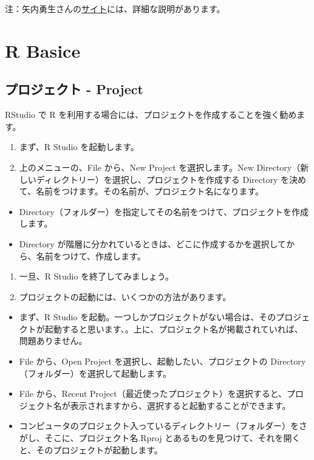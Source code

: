 \documentclass[
]{bxjsbook}
\providecommand{\tightlist}{%
  \setlength{\itemsep}{0pt}\setlength{\parskip}{0pt}}
\theoremstyle{definition}
\theoremstyle{definition}
\theoremstyle{definition}
\theoremstyle{definition}
\theoremstyle{remark}
\begin{document}
注：矢内勇生さんの\href{https://yukiyanai.github.io/jp/resources/docs/install-R_windows.pdf}{サイト}には、詳細な説明があります。

\hypertarget{rbasics}{%
\section{R Basice}\label{rbasics}}

\hypertarget{ux30d7ux30edux30b8ux30a7ux30afux30c8---project}{%
\subsection{プロジェクト - Project}\label{ux30d7ux30edux30b8ux30a7ux30afux30c8---project}}

RStudio で R を利用する場合には、プロジェクトを作成することを強く勧めます。

\begin{enumerate}
\def\labelenumi{\arabic{enumi}.}
\item
  まず、R Studio を起動します。
\item
  上のメニューの、File から、New Project を選択します。New Directory（新しいディレクトリー）を選択し、プロジェクトを作成する Directory を決めて、名前をつけます。その名前が、プロジェクト名になります。
\end{enumerate}

\begin{itemize}
\tightlist
\item
  Directory（フォルダー）を指定してその名前をつけて、プロジェクトを作成します。
\item
  Directory が階層に分かれているときは、どこに作成するかを選択してから、名前をつけて、作成します。
\end{itemize}

\begin{enumerate}
\def\labelenumi{\arabic{enumi}.}
\setcounter{enumi}{2}
\item
  一旦、R Studio を終了してみましょう。
\item
  プロジェクトの起動には、いくつかの方法があります。
\end{enumerate}

\begin{itemize}
\tightlist
\item
  まず、R Studio を起動。一つしかプロジェクトがない場合は、そのプロジェクトが起動すると思います、。上に、プロジェクト名が掲載されていれば、問題ありません。
\item
  File から、Open Project を選択し、起動したい、プロジェクトの Directory（フォルダー）を選択して起動します。
\item
  File から、Recent Project（最近使ったプロジェクト）を選択すると、プロジェクト名が表示されますから、選択すると起動することができます。
\item
  コンピュータのプロジェクト入っているディレクトリー（フォルダー）をさがし、そこに、プロジェクト名.Rproj とあるものを見つけて、それを開くと、そのプロジェクトが起動します。
\end{itemize}
\end{document}

